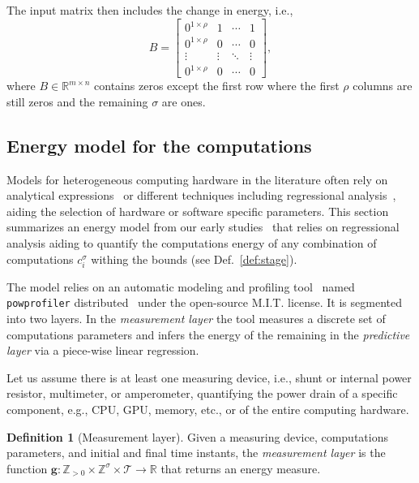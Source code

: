 \documentclass[letterpaper,10pt,journal,twoside]{IEEEtran}
\newcommand{\stt}[1]{{\small\tt #1}} %
\newcommand{\powprof}{\stt{powprofiler}}
\theoremstyle{definition}
\newtheorem{defn}{Definition}[section]
\begin{document}
The input matrix then includes the change in energy, i.e.,
\begin{equation}\label{eq:mat_B}
  B=\begin{bmatrix}
      0^{1\times\rho} & 1      & \cdots & 1      \\
      0^{1\times\rho} & 0      & \cdots & 0      \\ 
      \vdots          & \vdots & \ddots & \vdots \\
      0^{1\times\rho} & 0      & \cdots & 0   
  \end{bmatrix},
\end{equation}
where $B\in\mathbb{R}^{m\times n}$ contains zeros except the first row where the first $\rho$ columns are still zeros and the remaining $\sigma$ are ones. 

\subsection{Energy model for the computations}
\label{sec:mod-com}

Models for heterogeneous computing hardware in the literature often rely on analytical expressions~\cite{marowka2017energy,goraczko2008energy,calore2015energy,yang2017designing} or different techniques including regressional analysis~\cite{bailey2014adaptive,ma2012holistic,seewald2019coarse}, aiding the selection of hardware or software specific parameters. This section summarizes an energy model from our early studies~\cite{seewald2019component,seewald2019coarse} that relies on regressional analysis aiding to quantify the computations energy of any combination of computations $c_i^\sigma$ withing the bounds (see Def.~\ref{def:stage}).  

The model relies on an automatic modeling and profiling tool~\cite{seewald2019coarse} named \powprof{} distributed~\cite{powprofiler} under the open-source M.I.T. license. It is segmented into two layers. In the \emph{measurement layer} the tool measures a discrete set of computations parameters and infers the energy of the remaining in the \emph{predictive layer} via a piece-wise linear regression.

Let us assume there is at least one measuring device, i.e., shunt or internal power resistor, multimeter, or amperometer, quantifying the power drain of a specific component, e.g., CPU, GPU, memory, etc., or of the entire computing hardware.

\begin{defn}[Measurement layer]\label{def:meas}
  Given a measuring device, computations parameters, and initial and final time instants, the \emph{measurement layer} is the function $\mathbf{g}:\mathbb{Z}_{>0}\times\mathbb{Z}^\sigma\times\mathcal{T}\rightarrow\mathbb{R}$ that returns an energy measure.
\end{defn}
\end{document}
